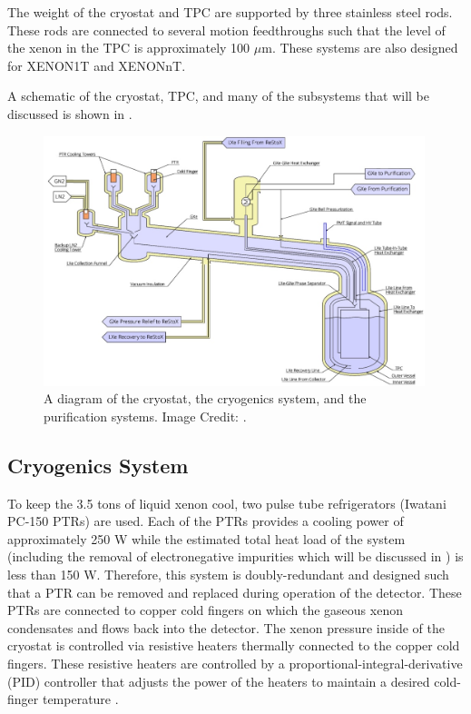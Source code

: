 The weight of the cryostat and TPC are supported by three stainless steel rods.  These rods are connected to several motion feedthroughs such that the level of the xenon in the TPC is approximately 100 $\mu$m.  These systems are also designed for XENON1T and XENONnT.

A schematic of the cryostat, TPC, and many of the subsystems that will be discussed is shown in .


\begin{figure}[t]
	\centering
	\includegraphics[width=0.99\textwidth]{diagram_cryo_pur_sys}
	\caption{A diagram of the cryostat, the cryogenics system, and the purification systems.  Image Credit: .}
	\label{fig:diagram_cryo_pur_sys}
\end{figure}


 \subsection{Cryogenics System}
 \label{sec:cryogenics_system}
 
 To keep the 3.5 tons of liquid xenon cool, two pulse tube refrigerators (Iwatani PC-150 PTRs) are used.  Each of the PTRs provides a cooling power of approximately 250 W while the estimated total heat load of the system (including the removal of electronegative impurities which will be discussed in ) is less than 150 W.  Therefore, this system is doubly-redundant and designed such that a PTR can be removed and replaced during operation of the detector.  These PTRs are connected to copper cold fingers on which the gaseous xenon condensates and flows back into the detector.  The xenon pressure inside of the cryostat is controlled via resistive heaters thermally connected to the copper cold fingers.  These resistive heaters are  controlled by a proportional-integral-derivative (PID) controller that adjusts the power of the heaters to maintain a desired cold-finger temperature \cite{aprile2017xenon1t}.
 

